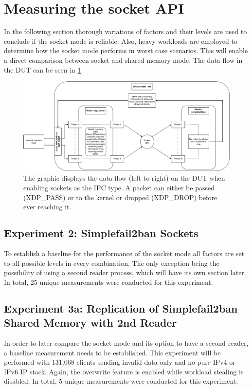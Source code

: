 \section{Measuring the socket API}
In the following section thorough variations of factors and their levels are used to conclude if the socket mode is reliable.
Also, heavy workloads are employed to determine how the socket mode performs in worst case scenarios.
This will enable a direct comparison between socket and shared memory mode.
The data flow in the DUT can be seen in \ref{fig:socket:measurement}.

\begin{figure}[h!]
    \centerline{\includegraphics[width=1.2\textwidth]{images/MeasurementArchitecture.pdf}}
    \caption[DUT during socket measurements]{
        The graphic displays the data flow (left to right) on the DUT when enabling sockets as the IPC type.
        A packet can either be passed (XDP\_PASS) or to the kernel or dropped (XDP\_DROP) before ever reaching it.}
	\label{fig:socket:measurement}
\end{figure}


\subsection{Experiment 2: Simplefail2ban Sockets}
To establish a baseline for the performance of the socket mode all factors are set to all possible levels in every combination.
The only exception being the possibility of using a second reader process, which will have its own section later.
In total, 25 unique measurements were conducted for this experiment.

\subsection{Experiment 3a: Replication of Simplefail2ban Shared Memory with 2nd Reader}
In order to later compare the socket mode and its option to have a second reader, a baseline measurement needs to be established.
This experiment will be performed with 131,068 clients sending invalid data only and no pure IPv4 or IPv6 IP stack.
Again, the overwrite feature is enabled while workload stealing is disabled.
In total, 5 unique measurements were conducted for this experiment.


